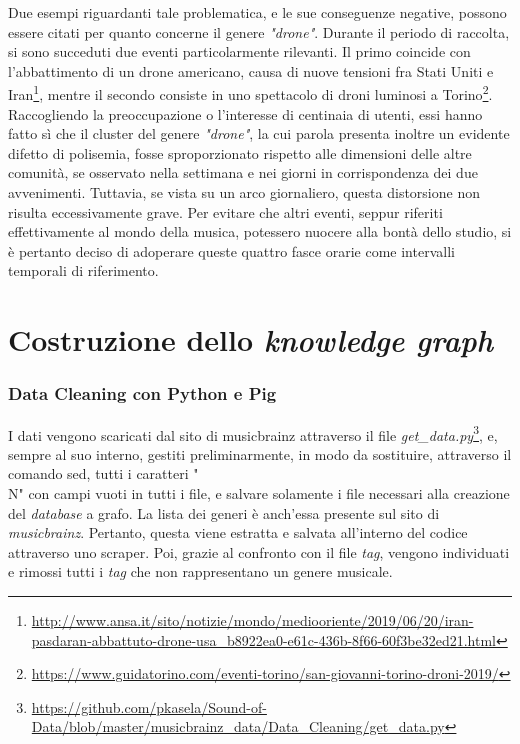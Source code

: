 \documentclass[12pt, a4paper, twocolumn]{article} %
\begin{document}
Due esempi riguardanti tale problematica, e le sue conseguenze negative, possono essere citati per quanto concerne il genere \textit{"drone"}. Durante il periodo di raccolta, si sono succeduti due eventi particolarmente rilevanti. Il primo coincide con l'abbattimento di un drone americano, causa di nuove tensioni fra Stati Uniti e Iran\footnote{\url{http://www.ansa.it/sito/notizie/mondo/mediooriente/2019/06/20/iran-pasdaran-abbattuto-drone-usa_b8922ea0-e61c-436b-8f66-60f3be32ed21.html}}, mentre il secondo consiste in uno spettacolo di droni luminosi a Torino\footnote{\url{https://www.guidatorino.com/eventi-torino/san-giovanni-torino-droni-2019/}}. Raccogliendo la preoccupazione o l'interesse di centinaia di utenti, essi hanno fatto sì che il cluster del genere \textit{"drone"}, la cui parola presenta inoltre un evidente difetto di polisemia, fosse sproporzionato rispetto alle dimensioni delle altre comunità, se osservato nella settimana e nei giorni in corrispondenza dei due avvenimenti. Tuttavia, se vista su un arco giornaliero, questa distorsione non risulta eccessivamente grave. Per evitare che altri eventi, seppur riferiti effettivamente al mondo della musica, potessero nuocere alla bontà dello studio, si è pertanto deciso di adoperare queste quattro fasce orarie come intervalli temporali di riferimento.

\hfill
\newpage
\part{Costruzione dello \textit{knowledge graph}}

\section{Data Cleaning con Python e Pig}


I dati vengono scaricati dal sito di musicbrainz attraverso il file \textit{get\_data.py}\footnote{\url{https://github.com/pkasela/Sound-of-Data/blob/master/musicbrainz_data/Data_Cleaning/get_data.py}}, e, sempre al suo interno, gestiti preliminarmente, in modo da sostituire, attraverso il comando sed, tutti i caratteri "\\N" con campi vuoti in tutti i file, e salvare solamente i file necessari alla creazione del \textit{database} a grafo. 
La lista dei generi è anch'essa presente sul sito di \textit{musicbrainz}. Pertanto, questa viene estratta e salvata all'interno del codice attraverso uno scraper. Poi, grazie al confronto con il file \textit{tag}, vengono individuati e rimossi tutti i \textit{tag} che non rappresentano un genere musicale.
\end{document}
